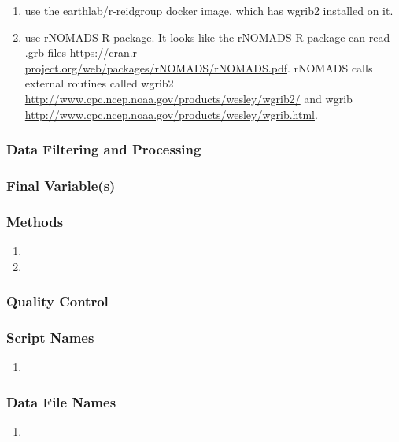 \begin{enumerate}


\item use the earthlab/r-reidgroup docker image, which has wgrib2 installed on it.

\item use rNOMADS R package. It looks like the rNOMADS R package can read .grb files \url{https://cran.r-project.org/web/packages/rNOMADS/rNOMADS.pdf}. rNOMADS calls external routines called wgrib2 \url{http://www.cpc.ncep.noaa.gov/products/wesley/wgrib2/} and wgrib \url{http://www.cpc.ncep.noaa.gov/products/wesley/wgrib.html}.

\end{enumerate}



\subsubsection*{Data Filtering and Processing}
\subsubsection*{Final Variable(s)}
\subsubsection*{Methods}
\begin{enumerate}
\item 
\item
\end{enumerate}
\subsubsection*{Quality Control}
\subsubsection*{Script Names}
\begin{enumerate}
\item 
\end{enumerate}
\subsubsection*{Data File Names}
\begin{enumerate}
\item 
\end{enumerate} 